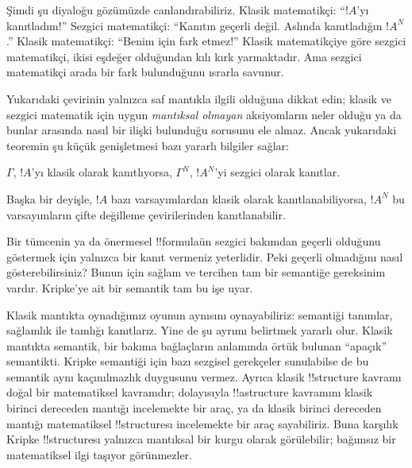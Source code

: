 Şimdi şu diyaloğu gözümüzde canlandırabiliriz. Klasik matematikçi: ``$!A$'yı
kanıtladım!'' Sezgici matematikçi: ``Kanıtın geçerli değil. Aslında kanıtladığın
$!A^N$.'' Klasik matematikçi: ``Benim için fark etmez!'' Klasik matematikçiye
göre sezgici matematikçi, ikisi eşdeğer olduğundan kılı kırk yarmaktadır. Ama
sezgici matematikçi arada bir fark bulunduğunu ısrarla savunur.

Yukarıdaki çevirinin yalnızca saf mantıkla ilgili olduğuna dikkat edin; klasik
ve sezgici matematik için uygun \emph{mantıksal olmayan} aksiyomların neler
olduğu ya da bunlar arasında nasıl bir ilişki bulunduğu sorusunu ele almaz.
Ancak yukarıdaki teoremin şu küçük genişletmesi bazı yararlı bilgiler sağlar:

\begin{thm}
$\Gamma$, $!A$'yı klasik olarak kanıtlıyorsa, $\Gamma^N$, $!A^N$'yi sezgici
olarak kanıtlar.
\end{thm}

Başka bir deyişle, $!A$ bazı varsayımlardan klasik olarak kanıtlanabiliyorsa,
$!A^N$ bu varsayımların çifte değilleme çevirilerinden kanıtlanabilir.

Bir tümcenin ya da önermesel !!{formula}{}ün sezgici bakımdan geçerli olduğunu
göstermek için yalnızca bir kanıt vermeniz yeterlidir. Peki geçerli
olmadığını nasıl gösterebilirsiniz? Bunun için sağlam ve tercihen tam
bir semantiğe gereksinim vardır. Kripke'ye ait bir semantik tam bu işe uyar.

Klasik mantıkta oynadığımız oyunun aynısını oynayabiliriz: semantiği tanımlar,
sağlamlık ile tamlığı kanıtlarız. Yine de şu ayrımı belirtmek yararlı olur.
Klasik mantıkta semantik, bir bakıma bağlaçların anlamında örtük bulunan
``apaçık'' semantikti. Kripke semantiği için bazı sezgisel gerekçeler
sunulabilse de bu semantik aynı kaçınılmazlık duygusunu vermez. Ayrıca klasik
!!{structure} kavramı doğal bir matematiksel kavramdır; dolayısıyla
!!a{structure} kavramını klasik birinci dereceden mantığı incelemekte bir araç,
ya da klasik birinci dereceden mantığı matematiksel !!{structure}{}sı incelemekte
bir araç sayabiliriz. Buna karşılık Kripke !!{structure}{}sı yalnızca mantıksal
bir kurgu olarak görülebilir; bağımsız bir matematiksel ilgi taşıyor
görünmezler.

